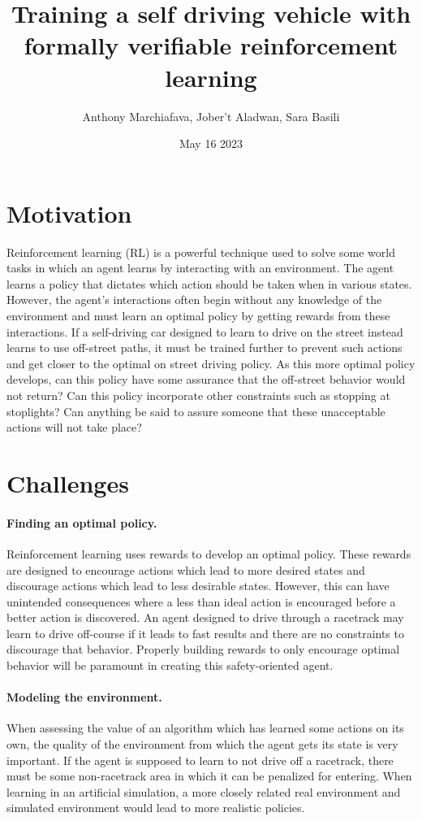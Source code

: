 \documentclass{article}
\title{Training a self driving vehicle with formally verifiable reinforcement learning}
\author{Anthony Marchiafava, Jober't Aladwan, Sara Basili}
\date{May 16 2023}
\begin{document}
\maketitle

\section{Motivation}
Reinforcement learning (RL) is a powerful technique used to solve some world tasks in which an agent learns by interacting with an environment. The agent learns a policy that dictates which action should be taken when in various states. However, the agent's interactions often begin without any knowledge of the environment and must learn an optimal policy by getting rewards from these interactions. If a self-driving car designed to learn to drive on the street instead learns to use off-street paths, it must be trained further to prevent such actions and get closer to the optimal on street driving policy. As this more optimal policy develops, can this policy have some assurance that the off-street behavior would not return? Can this policy incorporate other constraints such as stopping at stoplights? Can anything be said to assure someone that these unacceptable actions will not take place?


\section{Challenges}
\paragraph{Finding an optimal policy.} Reinforcement learning uses rewards to develop an optimal policy. These rewards are designed to encourage actions which lead to more desired states and discourage actions which lead to less desirable states. However, this can have unintended consequences where a less than ideal action is encouraged before a better action is discovered. An agent designed to drive through a racetrack may learn to drive off-course if it leads to fast results and there are no constraints to discourage that behavior. Properly building rewards to only encourage optimal behavior will be paramount in creating this safety-oriented agent.
\paragraph{Modeling the environment.} When assessing the value of an algorithm which has learned some actions on its own, the quality of the environment from which the agent gets its state is very important. If the agent is supposed to learn to not drive off a racetrack, there must be some non-racetrack area in which it can be penalized for entering. When learning in an artificial simulation, a more closely related real environment and simulated environment would lead to more realistic policies.
\end{document}
